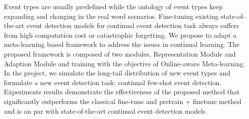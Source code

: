 Event types are usually predefined while the ontology of event types keep expanding and changing in the real word scenarios. Fine-tuning existing state-of-the-art event detection models for continual event detection task always suffers from high computation cost or catastrophic forgetting. We propose to adapt a meta-learning based framework to address the issues in continual learning. The proposed framework is composed of two modules, Representation Module and Adaption Module and training with the objective of Online-aware Meta-learning.  In the project, we simulate the long-tail distribution of new event types and formulate a new event detection task: continual few-shot event detection. Experiments results demonstrate the effectiveness of the proposed method that significantly outperforms the classical fine-tune and pretrain + finetune method and is on par with state-of-the-art continual event detection models. 